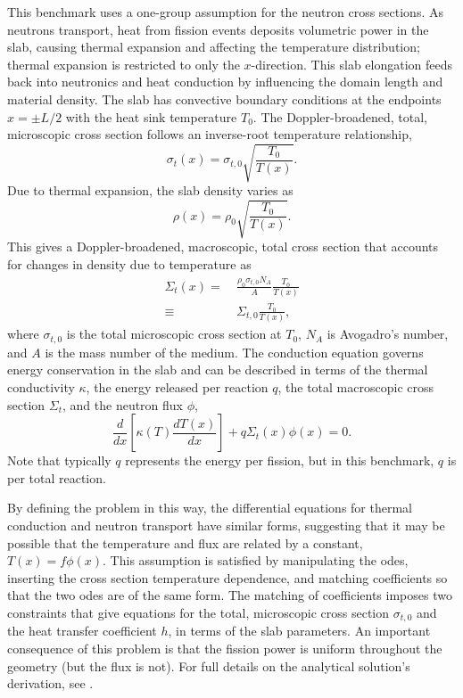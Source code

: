\documentclass[letterpaper]{mc2023}
\begin{document}
This benchmark uses a one-group assumption for the neutron cross sections. As neutrons transport, heat from fission events deposits
volumetric power in the slab, causing thermal expansion and affecting the temperature distribution; thermal expansion is restricted
to only the $x$-direction. This slab elongation feeds back into neutronics and heat conduction by influencing the domain length and
material density. The slab has convective boundary conditions at the endpoints $x=\pm L/2$ with the heat sink temperature
$T_{0}$. The Doppler-broadened, total, microscopic cross section follows an inverse-root temperature relationship,
\begin{equation}
    \sigma_{t}(x) = \sigma_{t,0}\sqrt{\frac{T_{0}}{T(x)}}.
\end{equation}
Due to thermal expansion, the slab density varies as
\begin{equation} \label{sec:intro:density}
    \rho(x) =  \rho_{0} \sqrt{\frac{T_{0}}{T(x)}}.
\end{equation}
This gives a Doppler-broadened, macroscopic, total cross section that accounts for changes in density due to temperature as
\begin{equation}\begin{aligned} \label{sec:intro:doppler}
    \Sigma_{t}(x) =&\  \frac{\rho_{0}\sigma_{t,0} N_{A}}{A} \frac{T_{0}}{T(x)}\\
    \equiv&\  \Sigma_{t,0}\frac{T_{0}}{T(x)} ,
\end{aligned}\end{equation}
where $ \sigma_{t,0}$ is the total microscopic cross section at $T_{0}$, $N_{A}$ is Avogadro's number, and $A$ is the mass number
of the medium. The conduction equation governs energy conservation in the slab and can be described in terms of the thermal conductivity
$\kappa$, the energy released per reaction $q$, the total macroscopic cross section $\Sigma_{t}$, and the neutron flux $\phi$,
\begin{equation}
     \frac{d}{dx}\left\lbrack\kappa(T)\frac{dT(x)}{dx}\right\rbrack + q \Sigma_{t}(x)\phi(x) = 0.
\end{equation}
Note that typically $q$ represents the energy per fission, but in this benchmark, $q$ is per total reaction.

By defining the problem in this way, the differential equations for thermal conduction and neutron transport have similar forms,
suggesting that it may be possible that the temperature and flux are related by a constant, $T(x)=f\phi(x)$. This
assumption is satisfied by manipulating the \glspl{ode}, inserting the cross section temperature dependence, and matching
coefficients so that the two \glspl{ode} are of the same form. The matching of coefficients imposes two constraints that give
equations for the total, microscopic cross section $\sigma_{t,0}$ and the heat transfer coefficient $h$, in terms of the slab
parameters. An important consequence of this problem is that the fission power is uniform throughout the geometry (but the
flux is not). For full details on the analytical solution's derivation, see \cite{analytical-benchmark}.
\end{document}
